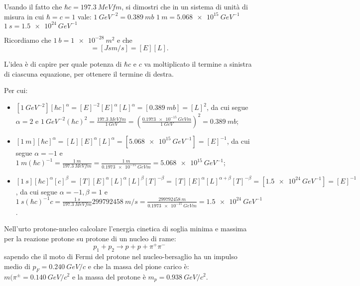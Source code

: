 
\begin{Exercise}[title={Unit\`a di misura}]
Usando il fatto che $\hbar c = \SI{197.3}{MeV fm}$, si dimostri che in un sistema di unità di misura in cui $\hbar=c=1$ vale:
\Question $\SI{1}{GeV^{-2}}=\SI{0.389}{mb}$
\Question $\SI{1}{m}=\SI{5.068e15}{GeV^{-1}}$
\Question $\SI{1}{s}=\SI{1.5e24}{GeV^{-1}}$
\end{Exercise}
Ricordiamo che $\SI{1}{b} = \SI{1e-28}{m^2}$ e che 
\begin{equation*}
    [\hbar c]=[\si{J s} \si{m/s}] = [E][L].
\end{equation*}
\begin{Answer}
L'idea è di capire per quale potenza di $\hbar c$ e $c$ va moltiplicato il termine a sinistra di ciascuna equazione, per ottenere il termine di destra. 

Per cui:
\begin{itemize}
    \item $[ \SI{1}{GeV^{-2}} ] [\hbar c]^\alpha = [E]^{-2} [E] ^\alpha [L]^\alpha = [\SI{0.389}{mb}] = [L]^2$, da cui segue $\alpha=2$ e $\SI{1}{GeV^{-2}}(\hbar c)^2=\frac{\SI{197.3}{MeV fm}}{\SI{1}{GeV}} = \left(\frac{\SI{0.1973e-15}{GeV m}}{\SI{1}{GeV}}\right)^2=\SI{0.389}{mb}$;

    \item $[ \SI{1}{m} ] [\hbar c]^\alpha = [L] [E] ^\alpha [L]^\alpha = [\SI{5.068e15}{GeV^{-1}}] = [E]^{-1}$, da cui segue $\alpha=-1$ e $\SI{1}{m}(\hbar c)^{-1}=\frac{\SI{1}{m}}{\SI{197.3}{MeV fm}} = \frac{\SI{1}{m}}{\SI{0.1973e-15}{GeV m}}=\SI{5.068e15}{GeV^{-1}}$;
    
    \item $[ \SI{1}{s} ] [\hbar c]^\alpha[c]^\beta  = [T] [E] ^\alpha [L]^\alpha [L]^\beta [T]^{-\beta} = [T] [E]^\alpha [L]^{\alpha+\beta} [T]^{-\beta} = [\SI{1.5e24}{GeV^{-1}}] = [E]^{-1}$, da cui segue $\alpha=-1, \beta=1$ e $\SI{1}{s}(\hbar c)^{-1}c=\frac{\SI{1}{s}}{\SI{197.3}{MeV fm}}\SI{299 792 458}{m/s} 
    = \frac{\SI{299 792 458}{m}}{\SI{0.1973e-15}{GeV m}} = \SI{1.5e24}{GeV^{-1}}$.
\end{itemize}
\end{Answer}


\begin{Exercise}[title={Energia di soglia di una reazione}]
  Nell’urto protone-nucleo calcolare l’energia cinetica di soglia
  minima e massima per la reazione protone su protone di un nucleo di
  rame:
  \begin{equation*}
    p_1 + p_2 \to p + p + \pi^+ \pi^-
  \end{equation*}
  sapendo che il moto di Fermi del protone nel nucleo-bersaglio ha un
  impulso medio di $p_F = \SI{0.240}{GeV/c}$ e che la massa del pione
  carico \`e: $m(\pi^\pm =\SI{0.140}{GeV/c^2}$ e la massa del protone
  \`e $m_p= \SI{0.938}{GeV/c^2}$.
\end{Exercise}

